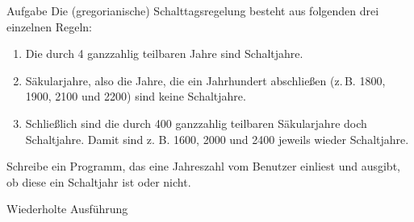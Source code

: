 \documentclass[
  aspectratio=1610,
]{beamer}
\begin{document}
\begin{frame}
  \begin{block}{Aufgabe}
    Die (gregorianische) Schalttagsregelung besteht aus folgenden drei einzelnen Regeln:
    \begin{enumerate}
      \item Die durch 4 ganzzahlig teilbaren Jahre sind Schaltjahre.
      \item Säkularjahre, also die Jahre, die ein Jahrhundert abschließen (z.\,B. 1800,
        1900, 2100 und 2200) sind keine Schaltjahre.
      \item Schließlich sind die durch 400 ganzzahlig teilbaren Säkularjahre doch
        Schaltjahre. Damit sind z. B. 1600, 2000 und 2400 jeweils wieder Schaltjahre.
    \end{enumerate}

    Schreibe ein Programm, das eine Jahreszahl vom Benutzer einliest und ausgibt, ob diese
    ein Schaltjahr ist oder nicht.
  \end{block}
\end{frame}

\begin{frame}{Wiederholte Ausführung}
\end{frame}
\end{document}
